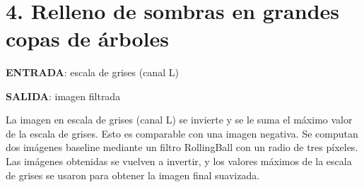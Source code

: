 \documentclass[11pt]{article}
\begin{document}
    \begin{center}
    \end{center}
    { \hspace*{\fill} \\}
    
    \begin{center}
    \end{center}
    { \hspace*{\fill} \\}
    
    \begin{center}
    \end{center}
    { \hspace*{\fill} \\}
    
    \hypertarget{relleno-de-sombras-en-grandes-copas-de-uxe1rboles}{%
\section{4. Relleno de sombras en grandes copas de
árboles}\label{relleno-de-sombras-en-grandes-copas-de-uxe1rboles}}

\textbf{ENTRADA}: escala de grises (canal L)

\textbf{SALIDA}: imagen filtrada

La imagen en escala de grises (canal L) se invierte y se le suma el
máximo valor de la escala de grises. Esto es comparable con una imagen
negativa. Se computan dos imágenes baseline mediante un filtro
RollingBall con un radio de tres píxeles. Las imágenes obtenidas se
vuelven a invertir, y los valores máximos de la escala de grises se
usaron para obtener la imagen final suavizada.
\end{document}
